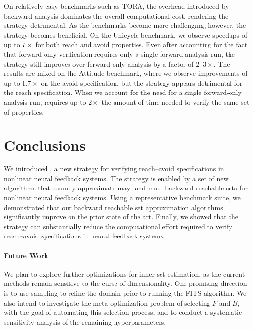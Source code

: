\documentclass[letterpaper, 10 pt, conference]{ieeeconf}  %
\begin{document}
On relatively easy benchmarks such as TORA, the overhead introduced by backward analysis dominates the overall computational cost, rendering the \fab strategy detrimental. As the benchmarks become more challenging, however, the \fab strategy becomes beneficial. On the Unicycle benchmark, we observe speedups of up to $7\times$ for both reach and avoid properties. Even after accounting for the fact that forward-only verification requires only a single forward-analysis run, the \fab strategy still improves over forward-only analysis by a factor of $2$--$3\times$. The results are mixed on the Attitude benchmark, where we observe improvements of up to $1.7\times$ on the avoid specification, but the \fab strategy appears detrimental for the reach specification. When we account for the need for a single forward-only analysis run, \fab requires up to $2\times$ the amount of time needed to verify the same set of properties. 

\section{Conclusions}
We introduced \fab, a new strategy for verifying reach--avoid specifications in nonlinear neural feedback systems. The \fab strategy is enabled by a set of new algorithms that soundly approximate may- and must-backward reachable sets for nonlinear neural feedback systems. Using a representative benchmark suite, we demonstrated that our backward reachable set approximation algorithms significantly improve on the prior state of the art. Finally, we showed that the \fab strategy can substantially reduce the computational effort required to verify reach--avoid specifications in neural feedback systems.
\paragraph{Future Work}
We plan to explore further optimizations for inner-set estimation, as the current methods remain sensitive to the curse of dimensionality. One promising direction is to use sampling to refine the domain prior to running the \textsc{FITS} algorithm. We also intend to investigate the meta-optimization problem of selecting $F$ and $B$, with the goal of automating this selection process, and to conduct a systematic sensitivity analysis of the remaining hyperparameters.
\end{document}
